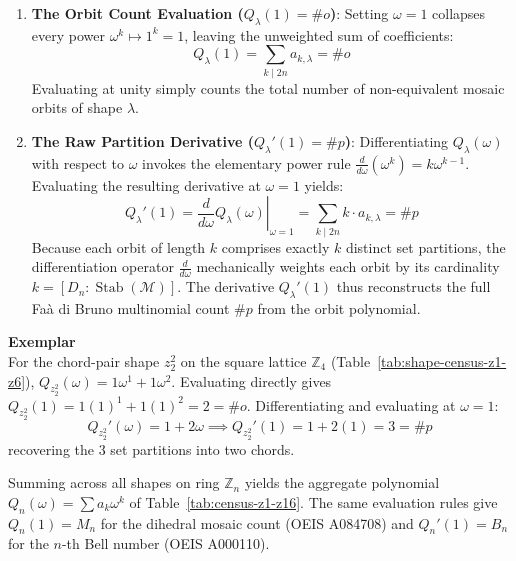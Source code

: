 \begin{enumerate}\setlength{\itemsep}{0pt}\setlength{\parskip}{0pt}
    \item \textbf{The Orbit Count Evaluation ($Q_\lambda(1) = \#o$)}:
    Setting $\omega = 1$ collapses every power $\omega^k \mapsto 1^k = 1$, leaving the unweighted sum of coefficients:
    \begin{equation}
    Q_\lambda(1) = \sum_{k \mid 2n} a_{k,\lambda} = \#o
    \end{equation}
    Evaluating at unity simply counts the total number of non-equivalent mosaic orbits of shape $\lambda$.

    \item \textbf{The Raw Partition Derivative ($Q_\lambda'(1) = \#p$)}:
    Differentiating $Q_\lambda(\omega)$ with respect to $\omega$ invokes the elementary power rule $\frac{d}{d\omega}(\omega^k) = k \omega^{k-1}$. Evaluating the resulting derivative at $\omega = 1$ yields:
    \begin{equation}
    Q_\lambda'(1) = \left. \frac{d}{d\omega} Q_\lambda(\omega) \right|_{\omega = 1} = \sum_{k \mid 2n} k \cdot a_{k,\lambda} = \#p
    \end{equation}
    Because each orbit of length $k$ comprises exactly $k$ distinct set partitions, the differentiation operator $\frac{d}{d\omega}$ mechanically weights each orbit by its cardinality $k = [D_n : \operatorname{Stab}(\mathcal{M})]$. The derivative $Q_\lambda'(1)$ thus reconstructs the full Fa\`a di Bruno multinomial count $\#p$ from the orbit polynomial.
\end{enumerate}

\noindent\textbf{Exemplar}\\[0.2em]
For the chord-pair shape $z_2^2$ on the square lattice $\mathbb{Z}_4$ (Table~\ref{tab:shape-census-z1-z6}), $Q_{z_2^2}(\omega) = 1\omega^1 + 1\omega^2$. Evaluating directly gives $Q_{z_2^2}(1) = 1(1)^1 + 1(1)^2 = 2 = \#o$. Differentiating and evaluating at $\omega = 1$:
\begin{equation}
Q_{z_2^2}'(\omega) = 1 + 2\omega \implies Q_{z_2^2}'(1) = 1 + 2(1) = 3 = \#p
\end{equation}
recovering the $3$ set partitions into two chords.

Summing across all shapes on ring $\mathbb{Z}_n$ yields the aggregate polynomial $Q_n(\omega) = \sum a_k \omega^k$ of Table~\ref{tab:census-z1-z16}. The same evaluation rules give $Q_n(1) = M_n$ for the dihedral mosaic count (OEIS A084708) and $Q_n'(1) = B_n$ for the $n$-th Bell number (OEIS A000110).

